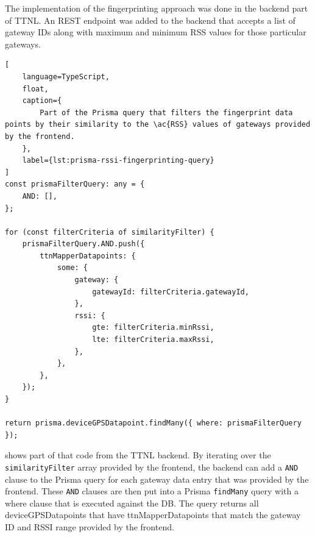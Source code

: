The implementation of the fingerprinting approach was done in the backend part of \ac{TTNL}.
An \ac{REST} endpoint was added to the backend that accepts a list of gateway IDs along with maximum and minimum \ac{RSS} values for those particular gateways.

\begin{lstlisting}[
    language=TypeScript,
    float,
    caption={
        Part of the Prisma query that filters the fingerprint data points by their similarity to the \ac{RSS} values of gateways provided by the frontend.
    },
    label={lst:prisma-rssi-fingerprinting-query}
]
const prismaFilterQuery: any = {
    AND: [],
};

for (const filterCriteria of similarityFilter) {
    prismaFilterQuery.AND.push({
        ttnMapperDatapoints: {
            some: {
                gateway: {
                    gatewayId: filterCriteria.gatewayId,
                },
                rssi: {
                    gte: filterCriteria.minRssi,
                    lte: filterCriteria.maxRssi,
                },
            },
        },
    });
}

return prisma.deviceGPSDatapoint.findMany({ where: prismaFilterQuery });
\end{lstlisting}

 shows part of that code from the \ac{TTNL} backend.
By iterating over the \lstinline|similarityFilter| array provided by the frontend, the backend can add a \lstinline|AND| clause to the Prisma query for each gateway data entry that was provided by the frontend.
These \lstinline|AND| clauses are then put into a Prisma \lstinline|findMany| query with a where clause that is executed against the \ac{DB}.
The query returns all deviceGPSDatapoints that have ttnMapperDatapoints that match the gateway ID and \ac{RSSI} range provided by the frontend.

